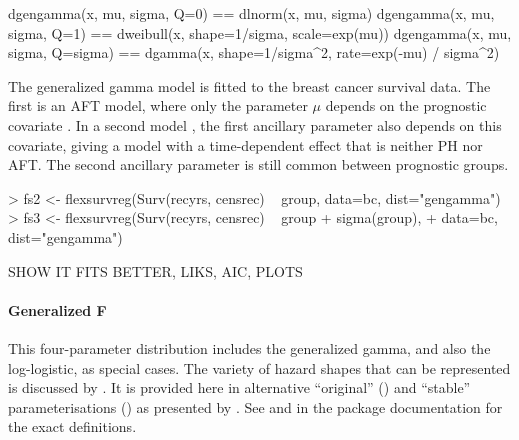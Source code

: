 \documentclass[nojss,nofooter]{jss}
\begin{document}
\begin{Code}
dgengamma(x, mu, sigma, Q=0)     ==  dlnorm(x, mu, sigma)                                
dgengamma(x, mu, sigma, Q=1)     ==  dweibull(x, shape=1/sigma, scale=exp(mu))           
dgengamma(x, mu, sigma, Q=sigma) ==  dgamma(x, shape=1/sigma^2, 
                                               rate=exp(-mu) / sigma^2)  
\end{Code}

The generalized gamma model is fitted to the breast cancer survival
data. The first  is an AFT model, where only the parameter
$\mu$ depends on the prognostic covariate .  In a second
model , the first ancillary parameter  also
depends on this covariate, giving a model with a time-dependent effect
that is neither PH nor AFT.  The second ancillary parameter 
is still common between prognostic groups.
\begin{Schunk}
\begin{Sinput}
> fs2 <- flexsurvreg(Surv(recyrs, censrec) ~ group, data=bc, dist="gengamma")
> fs3 <- flexsurvreg(Surv(recyrs, censrec) ~ group + sigma(group), 
+                    data=bc, dist="gengamma")
\end{Sinput}
\end{Schunk}
SHOW IT FITS BETTER, LIKS, AIC, PLOTS

\paragraph{Generalized F} This four-parameter distribution includes
the generalized gamma, and also the log-logistic, as special cases.
The variety of hazard shapes that can be represented is discussed by
\citet{ccox:genf}.  It is provided here in alternative ``original''
() and ``stable'' parameterisations
() as presented by \citet{prentice:genf}. 
See  and  in the package documentation 
for the exact definitions.
\end{document}
